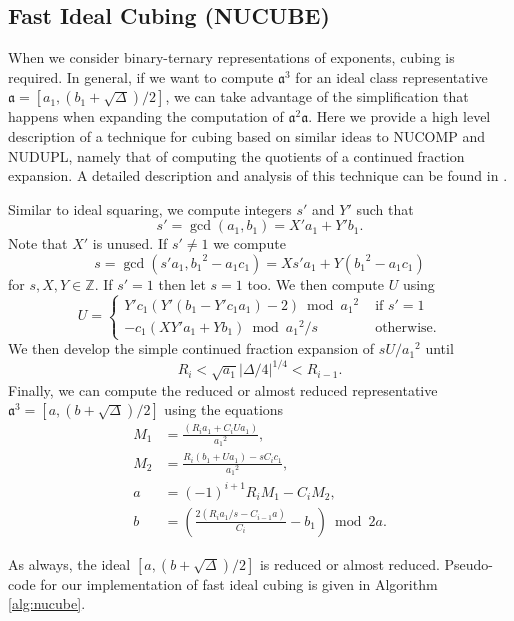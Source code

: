 \documentclass{ucalgthes1}
\theoremstyle{plain}
\theoremstyle{definition}
\newcommand{\ZZ}{\mathbb{Z}}
\begin{document}
\subsection{Fast Ideal Cubing (NUCUBE)}\label{subsec:nucube}

When we consider binary-ternary representations of exponents, cubing is required.  In general, if we want to compute ${\mathfrak a}^3$ for an ideal class representative $\mathfrak a = [a_1, (b_1+\sqrt\Delta)/2]$, we can take advantage of the simplification that happens when expanding the computation of ${\mathfrak a}^2 \mathfrak a$.  Here we provide a high level description of a technique for cubing based on similar ideas to NUCOMP and NUDUPL, namely that of computing the quotients of a continued fraction expansion.  A detailed description and analysis of this technique can be found in \cite{Imbert2010}.

Similar to ideal squaring, we compute integers $s'$ and $Y'$ such that
\[
s' = \gcd(a_1, b_1) = X'a_1 + Y'b_1.
\]
Note that $X'$ is unused. If $s' \neq 1$ we compute
\[
s = \gcd(s'a_1, {b_1}^2 - a_1c_1) = Xs'a_1 + Y({b_1}^2 - a_1c_1)
\]
for $s, X, Y \in \ZZ$.  If $s' = 1$ then let $s = 1$ too.  We then compute $U$ using
\[
U = \begin{cases}
		Y'c_1(Y'(b_1 - Y'c_1a_1) - 2) \bmod {a_1}^2 & \textrm{ if } s' = 1 \\
		-c_1(XY'a_1+Yb_1) \bmod {a_1}^2/s & \textrm{ otherwise.}
    \end{cases}
\]
We then develop the simple continued fraction expansion of $sU/{a_1}^2$ until
\[
	R_i < \sqrt{a_1}|\Delta/4|^{1/4} < R_{i-1}.
\]
Finally, we can compute the reduced or almost reduced representative $\mathfrak a^3 = [a, (b + \sqrt\Delta)/2]$ using the equations
\begin{align*}
	M_1 &= \frac{(R_ia_1 + C_iUa_1)}{{a_1}^2}, \\
	M_2 &= \frac{R_i(b_1 + Ua_1) - sC_ic_1}{{a_1}^2}, \\
	a &= (-1)^{i+1} R_i M_1 - C_i M_2, \\
	b &= \left( \frac{2(R_ia_1/s - C_{i-1}a)}{C_i} - b_1 \right) \bmod 2a.
\end{align*}

As always, the ideal $[a, (b + \sqrt\Delta)/2]$ is reduced or almost reduced. Pseudo-code for our implementation of fast ideal cubing is given in Algorithm \ref{alg:nucube}.
\end{document}

